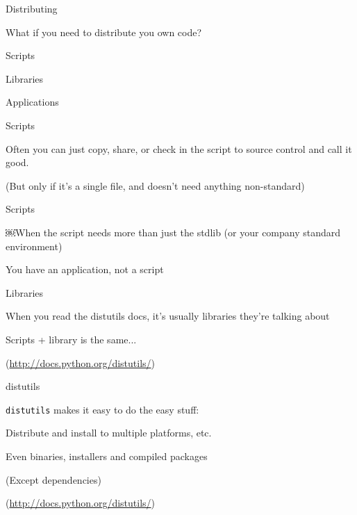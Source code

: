 \documentclass{beamer}
\begin{document}
\begin{frame}[fragile]{Distributing}

{\LARGE What if you need to distribute you own code?}

\vfill
{\Large Scripts}

\vfill
{\Large Libraries }

\vfill
{\Large Applications }
\vfill

\end{frame} 

\begin{frame}[fragile]{Scripts}

\vfill
{\LARGE Often you can just copy, share, or check in the script to source
control and call it good.}

\vfill
{\large (But only if it's a single file, and doesn't need anything non-standard) }
\end{frame} 

\begin{frame}[fragile]{Scripts}

\vfill
{\LARGE ￼When the script needs more than just the stdlib (or your company standard environment)}

\vfill
{\LARGE You have an application, not a script}

\vfill

\end{frame} 

\begin{frame}[fragile]{Libraries}

\vfill
{\LARGE When you read the distutils docs, it's usually libraries they're talking about}


\vfill
{\LARGE Scripts + library is the same...}


\vfill
(\url{http://docs.python.org/distutils/})
\end{frame} 

\begin{frame}[fragile]{distutils}

\vfill
{\LARGE \verb|distutils| makes it easy to do the easy stuff:}

\vfill
{\Large Distribute and install to multiple platforms, etc.}

\vfill
{\Large Even binaries, installers and compiled packages}

\vfill
{\Large (Except dependencies)}

\vfill
(\url{http://docs.python.org/distutils/})
\end{frame} 
\end{document}
